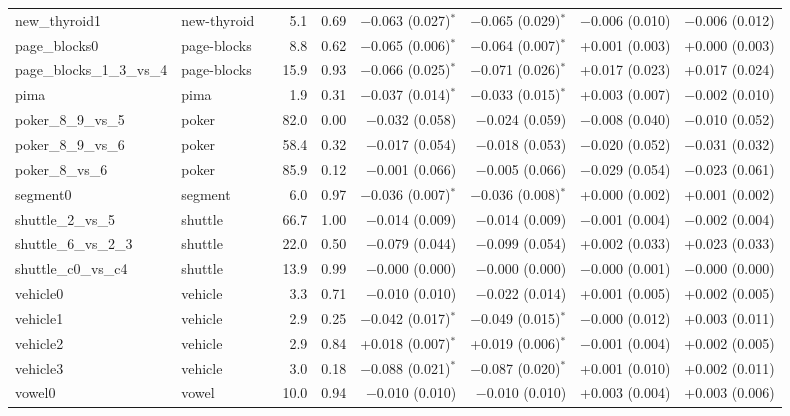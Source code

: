 \begin{table}[!htbp]
\begin{tabular}{lllrrrrrr}
new\_thyroid1 & new-thyroid &  & 5.1 & 0.69 & $-$0.063 (0.027)$^{*}$ & $-$0.065 (0.029)$^{*}$ & $-$0.006 (0.010) & $-$0.006 (0.012) \\
page\_blocks0 & page-blocks &  & 8.8 & 0.62 & $-$0.065 (0.006)$^{*}$ & $-$0.064 (0.007)$^{*}$ & +0.001 (0.003) & +0.000 (0.003) \\
page\_blocks\_1\_3\_vs\_4 & page-blocks &  & 15.9 & 0.93 & $-$0.066 (0.025)$^{*}$ & $-$0.071 (0.026)$^{*}$ & +0.017 (0.023) & +0.017 (0.024) \\
pima & pima &  & 1.9 & 0.31 & $-$0.037 (0.014)$^{*}$ & $-$0.033 (0.015)$^{*}$ & +0.003 (0.007) & $-$0.002 (0.010) \\
poker\_8\_9\_vs\_5 & poker &  & 82.0 & 0.00 & $-$0.032 (0.058) & $-$0.024 (0.059) & $-$0.008 (0.040) & $-$0.010 (0.052) \\
poker\_8\_9\_vs\_6 & poker &  & 58.4 & 0.32 & $-$0.017 (0.054) & $-$0.018 (0.053) & $-$0.020 (0.052) & $-$0.031 (0.032) \\
poker\_8\_vs\_6 & poker &  & 85.9 & 0.12 & $-$0.001 (0.066) & $-$0.005 (0.066) & $-$0.029 (0.054) & $-$0.023 (0.061) \\
segment0 & segment &  & 6.0 & 0.97 & $-$0.036 (0.007)$^{*}$ & $-$0.036 (0.008)$^{*}$ & +0.000 (0.002) & +0.001 (0.002) \\
shuttle\_2\_vs\_5 & shuttle &  & 66.7 & 1.00 & $-$0.014 (0.009) & $-$0.014 (0.009) & $-$0.001 (0.004) & $-$0.002 (0.004) \\
shuttle\_6\_vs\_2\_3 & shuttle &  & 22.0 & 0.50 & $-$0.079 (0.044) & $-$0.099 (0.054) & +0.002 (0.033) & +0.023 (0.033) \\
shuttle\_c0\_vs\_c4 & shuttle &  & 13.9 & 0.99 & $-$0.000 (0.000) & $-$0.000 (0.000) & $-$0.000 (0.001) & $-$0.000 (0.000) \\
vehicle0 & vehicle &  & 3.3 & 0.71 & $-$0.010 (0.010) & $-$0.022 (0.014) & +0.001 (0.005) & +0.002 (0.005) \\
vehicle1 & vehicle &  & 2.9 & 0.25 & $-$0.042 (0.017)$^{*}$ & $-$0.049 (0.015)$^{*}$ & $-$0.000 (0.012) & +0.003 (0.011) \\
vehicle2 & vehicle &  & 2.9 & 0.84 & +0.018 (0.007)$^{*}$ & +0.019 (0.006)$^{*}$ & $-$0.001 (0.004) & +0.002 (0.005) \\
vehicle3 & vehicle &  & 3.0 & 0.18 & $-$0.088 (0.021)$^{*}$ & $-$0.087 (0.020)$^{*}$ & +0.001 (0.010) & +0.002 (0.011) \\
vowel0 & vowel &  & 10.0 & 0.94 & $-$0.010 (0.010) & $-$0.010 (0.010) & +0.003 (0.004) & +0.003 (0.006) \\

\end{tabular}
\end{table}
